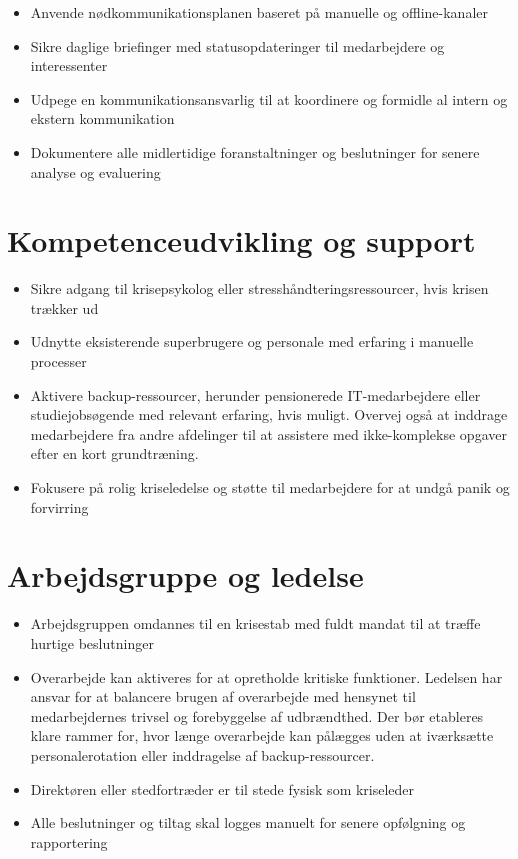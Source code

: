 \documentclass[a4paper,11pt]{book}
\begin{document}
\begin{itemize}
\tightlist
\item
  Anvende nødkommunikationsplanen baseret på manuelle og offline-kanaler
\item
  Sikre daglige briefinger med statusopdateringer til medarbejdere og
  interessenter
\item
  Udpege en kommunikationsansvarlig til at koordinere og formidle al
  intern og ekstern kommunikation
\item
  Dokumentere alle midlertidige foranstaltninger og beslutninger for
  senere analyse og evaluering
\end{itemize}

\section{Kompetenceudvikling og
support}\label{kompetenceudvikling-og-support}

\begin{itemize}
\tightlist
\item
  Sikre adgang til krisepsykolog eller stresshåndteringsressourcer, hvis
  krisen trækker ud
\item
  Udnytte eksisterende superbrugere og personale med erfaring i manuelle
  processer
\item
  Aktivere backup-ressourcer, herunder pensionerede IT-medarbejdere
  eller studiejobsøgende med relevant erfaring, hvis muligt. Overvej
  også at inddrage medarbejdere fra andre afdelinger til at assistere
  med ikke-komplekse opgaver efter en kort grundtræning.
\item
  Fokusere på rolig kriseledelse og støtte til medarbejdere for at undgå
  panik og forvirring
\end{itemize}

\section{Arbejdsgruppe og ledelse}\label{arbejdsgruppe-og-ledelse}

\begin{itemize}
\tightlist
\item
  Arbejdsgruppen omdannes til en krisestab med fuldt mandat til at
  træffe hurtige beslutninger
\item
  Overarbejde kan aktiveres for at opretholde kritiske funktioner.
  Ledelsen har ansvar for at balancere brugen af overarbejde med
  hensynet til medarbejdernes trivsel og forebyggelse af udbrændthed.
  Der bør etableres klare rammer for, hvor længe overarbejde kan
  pålægges uden at iværksætte personalerotation eller inddragelse af
  backup-ressourcer.
\item
  Direktøren eller stedfortræder er til stede fysisk som kriseleder
\item
  Alle beslutninger og tiltag skal logges manuelt for senere opfølgning
  og rapportering
\end{itemize}
\end{document}
